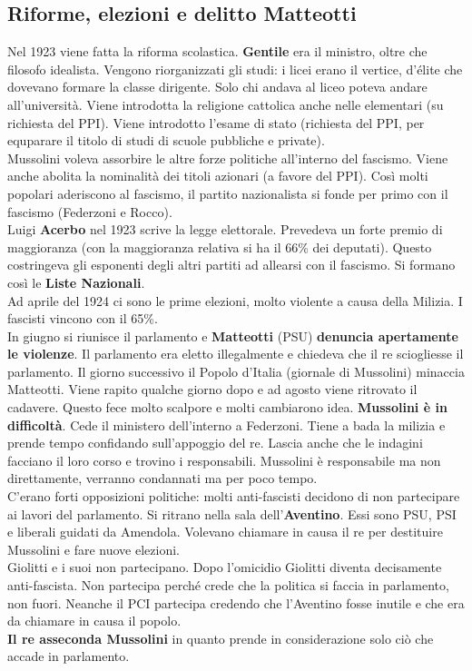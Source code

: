 \subsection{Riforme, elezioni e delitto Matteotti}
Nel 1923 viene fatta la riforma scolastica. \textbf{Gentile} era il ministro, oltre che filosofo
idealista. Vengono riorganizzati gli studi: i licei erano il vertice, d'élite che dovevano
formare la classe dirigente. Solo chi andava al liceo poteva andare all'università. Viene introdotta
la religione cattolica anche nelle elementari (su richiesta del PPI). Viene introdotto l'esame di
stato (richiesta del PPI, per equparare il titolo di studi di scuole pubbliche e private).\\
[\baselineskip]
Mussolini voleva assorbire le altre forze politiche all'interno del fascismo. Viene anche abolita la
nominalità dei titoli azionari (a favore del PPI). Così molti popolari aderiscono al fascismo, il
partito nazionalista si fonde per primo con il fascismo (Federzoni e Rocco).\\ [\baselineskip]
Luigi \textbf{Acerbo} nel 1923 scrive la legge elettorale. Prevedeva un forte premio di maggioranza
(con la maggioranza relativa si ha il 66\% dei deputati). Questo costringeva gli esponenti degli
altri partiti ad allearsi con il fascismo. Si formano così le \textbf{Liste Nazionali}.\\
Ad aprile del 1924 ci sono le prime elezioni, molto violente a causa della Milizia. I fascisti 
vincono con il 65\%.\\
In giugno si riunisce il parlamento e \textbf{Matteotti} (PSU) \textbf{denuncia apertamente le 
violenze}. Il parlamento era eletto illegalmente e chiedeva che il re sciogliesse il parlamento. Il
giorno successivo il Popolo d'Italia (giornale di Mussolini) minaccia Matteotti. Viene rapito qualche
giorno dopo e ad agosto viene ritrovato il cadavere. Questo fece molto scalpore e molti cambiarono
idea. \textbf{Mussolini è in difficoltà}. Cede il ministero dell'interno a Federzoni. Tiene a 
bada la milizia e prende tempo confidando sull'appoggio del re. Lascia anche che le indagini facciano
il loro corso e trovino i responsabili. Mussolini è responsabile ma non direttamente, verranno 
condannati ma per poco tempo.\\
C'erano forti opposizioni politiche: molti anti-fascisti decidono di non partecipare ai lavori del
parlamento. Si ritrano nella sala dell'\textbf{Aventino}. Essi sono PSU, PSI e liberali guidati da
Amendola. Volevano chiamare in causa il re per destituire Mussolini e fare nuove elezioni.\\
Giolitti e i suoi non partecipano. Dopo l'omicidio Giolitti diventa decisamente anti-fascista. Non
partecipa perché crede che la politica si faccia in parlamento, non fuori. Neanche il PCI partecipa
credendo che l'Aventino fosse inutile e che era da chiamare in causa il popolo.\\
\textbf{Il re asseconda Mussolini} in quanto prende in considerazione solo ciò che accade in 
parlamento. 

